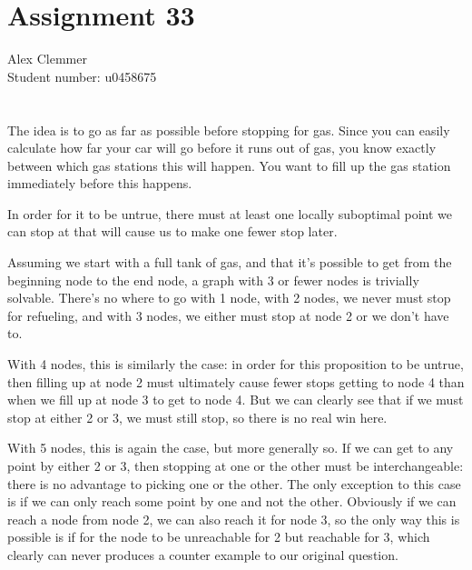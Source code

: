 \documentclass[a4paper]{article}
\begin{document}
\section*{Assignment 33}
Alex Clemmer\\
Student number: u0458675

\section{}

The idea is to go as far as possible before stopping for gas. Since you can easily calculate how far your car will go before it runs out of gas, you know exactly between which gas stations this will happen. You want to fill up the gas station immediately before this happens.

In order for it to be untrue, there must at least one locally suboptimal point we can stop at that will cause us to make one fewer stop later.

Assuming we start with a full tank of gas, and that it's possible to get from the beginning node to the end node, a graph with 3 or fewer nodes is trivially solvable. There's no where to go with 1 node, with 2 nodes, we never must stop for refueling, and with 3 nodes, we either must stop at node 2 or we don't have to.

With 4 nodes, this is similarly the case: in order for this proposition to be untrue, then filling up at node 2 must ultimately cause fewer stops getting to node 4 than when we fill up at node 3 to get to node 4. But we can clearly see that if we must stop at either 2 or 3, we must still stop, so there is no real win here.

With 5 nodes, this is again the case, but more generally so. If we can get to any point by either 2 or 3, then stopping at one or the other must be interchangeable: there is no advantage to picking one or the other. The only exception to this case is if we can only reach some point by one and not the other. Obviously if we can reach a node from node 2, we can also reach it for node 3, so the only way this is possible is if for the node to be unreachable for 2 but reachable for 3, which clearly can never produces a counter example to our original question.
\end{document}
